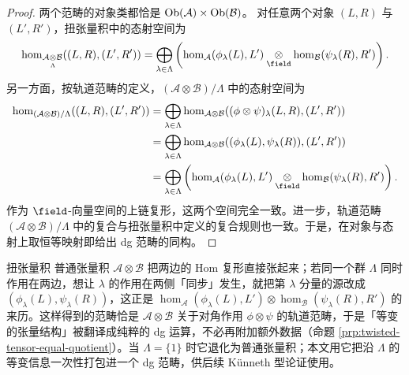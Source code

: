 \begin{proof}
两个范畴的对象类都恰是 $\operatorname{Ob}(\mathcal{A})\times \operatorname{Ob}(\mathcal{B})$。
对任意两个对象 $(L,R)$ 与 $(L',R')$，扭张量积中的态射空间为
$$
\hom_{\mathcal{A}\underset{\Lambda}{\otimes}\mathcal{B}}((L,R),(L',R'))
=
\bigoplus_{\lambda\in\Lambda}
\left(
\hom_{\mathcal{A}}(\phi_{\lambda}(L),L')
\underset{\field}{\otimes}
\hom_{\mathcal{B}}(\psi_{\lambda}(R),R')
\right).
$$
另一方面，按轨道范畴的定义，$(\mathcal{A}\otimes\mathcal{B})/\Lambda$ 中的态射空间为
\begin{align*}
\hom_{(\mathcal{A}\otimes\mathcal{B})/\Lambda}((L,R),(L',R'))
&=
\bigoplus_{\lambda\in\Lambda}
\hom_{\mathcal{A}\otimes\mathcal{B}}((\phi\otimes\psi)_\lambda(L,R), (L',R'))
\\
&=
\bigoplus_{\lambda\in\Lambda}
\hom_{\mathcal{A}\otimes\mathcal{B}}((\phi_\lambda(L),\psi_\lambda(R)), (L',R'))
\\
&=
\bigoplus_{\lambda\in\Lambda}
\left(
\hom_{\mathcal{A}}(\phi_{\lambda}(L),L')
\underset{\field}{\otimes}
\hom_{\mathcal{B}}(\psi_{\lambda}(R),R')
\right).
\end{align*}
作为 $\field$-向量空间的上链复形，这两个空间完全一致。进一步，轨道范畴 $(\mathcal{A}\otimes\mathcal{B})/\Lambda$ 中的复合与扭张量积中定义的复合规则也一致。于是，在对象与态射上取恒等映射即给出 dg 范畴的同构。
\end{proof}

\begin{conceptbox}{扭张量积}
普通张量积 $\mathcal{A}\otimes\mathcal{B}$ 把两边的 Hom 复形直接张起来；若同一个群 $\Lambda$ 同时作用在两边，想让 $\lambda$ 的作用在两侧「同步」发生，就把第 $\lambda$ 分量的源改成 $(\phi_\lambda(L),\psi_\lambda(R))$，这正是 $\hom_{\mathcal{A}}(\phi_\lambda(L),L')\otimes\hom_{\mathcal{B}}(\psi_\lambda(R),R')$ 的来历。这样得到的范畴恰是 $\mathcal{A}\otimes\mathcal{B}$ 关于对角作用 $\phi\otimes\psi$ 的轨道范畴，于是「等变的张量结构」被翻译成纯粹的 dg 运算，不必再附加额外数据（命题 \ref{prp:twisted-tensor-equal-quotient}）。当 $\Lambda=\{1\}$ 时它退化为普通张量积；本文用它把沿 $\Lambda$ 的等变信息一次性打包进一个 dg 范畴，供后续 Künneth 型论证使用。
\par\smallskip{}
\end{conceptbox}

